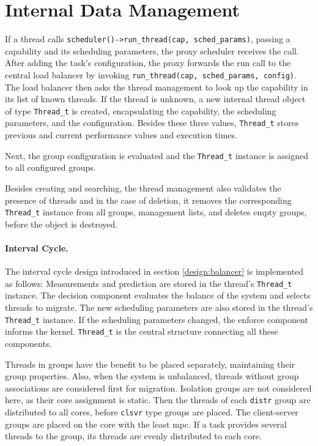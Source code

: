 \section{Internal Data Management}
\label{impl:internal}

If a thread calls \texttt{scheduler()->run\_thread(cap, sched\_params)}, passing
a capability and its scheduling parameters, the proxy scheduler
receives the call.
After adding the task's configuration, the proxy forwards the run call to the
central load balancer by invoking \texttt{run\_thread(cap, sched\_params, config)}.
The load balancer then asks the thread management to look up the capability in
its list of known threads.
If the thread is unknown, a new internal thread object of type
\texttt{Thread\_t} is created, encapsulating the capability, the scheduling
parameters, and the configuration.
Besides these three values, \texttt{Thread\_t} stores previous and current
performance values and execution times.

Next, the group configuration is evaluated and the \texttt{Thread\_t} instance
is assigned to all configured groups.

Besides creating and searching, the thread management also validates the
presence of threads and in the case of deletion, it removes the corresponding
\texttt{Thread\_t} instance from all groups, management lists, and deletes empty
groups, before the object is destroyed.


\paragraph{Interval Cycle.}
The interval cycle design introduced in section \ref{design:balancer} is
implemented as follows:
Measurements and prediction are stored in the thread's \texttt{Thread\_t}
instance.
The decision component evaluates the balance of the system and selects threads
to migrate.
The new scheduling parameters are also stored in the thread's \texttt{Thread\_t}
instance.
If the scheduling parameters changed, the enforce component informs the kernel.
\texttt{Thread\_t} is the central structure connecting all these components.

Threads in groups have the benefit to be placed separately, maintaining their
group properties.
Also, when the system is unbalanced, threads without group associations are
considered first for migration.
Isolation groups are not considered here, as their core assignment is static.
Then the threads of each \texttt{distr} group are distributed to all cores, before
\texttt{clsvr} type groups are placed.
The client-server groups are placed on the core with the least \gls{mpc}.
If a task provides several threads to the group, its threads are evenly
distributed to each core.

